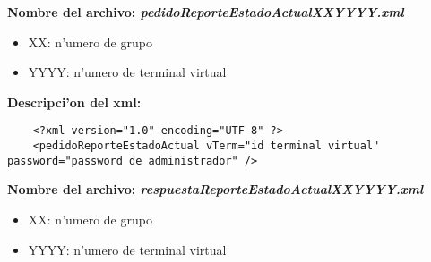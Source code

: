 \bf{Nombre del archivo:} \it{pedidoReporteEstadoActualXXYYYY.xml}
\begin{itemize}
    \item{XX: n'umero de grupo}
    \item{YYYY: n'umero de terminal virtual}
\end{itemize}

\bf{Descripci'on del xml:}
\begin{verbatim}
    <?xml version="1.0" encoding="UTF-8" ?>
    <pedidoReporteEstadoActual vTerm="id terminal virtual" password="password de administrador" />
\end{verbatim}


\bf{Nombre del archivo:} \it{respuestaReporteEstadoActualXXYYYY.xml}
\begin{itemize}
    \item{XX: n'umero de grupo}
    \item{YYYY: n'umero de terminal virtual}
\end{itemize}

